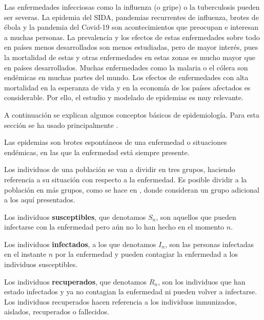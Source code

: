 Las enfermedades infecciosas como la influenza (o gripe) o la tuberculosis pueden ser severas. La epidemia del SIDA, pandemias recurrentes de influenza, brotes de ébola y la pandemia del Covid-19 son acontecimientos que preocupan e interesan a muchas personas. La prevalencia y los efectos de estas enfermedades sobre todo en países menos desarrollados son menos estudiadas, pero de mayor interés, pues la mortalidad de estas y otras enfermedades en estas zonas es mucho mayor que en países desarrollados. Muchas enfermedades como la malaria o el cólera son endémicas en muchas partes del mundo. Los efectos de enfermedades con alta mortalidad en la esperanza de vida y en la economía de los países afectados es considerable. Por ello, el estudio y modelado de epidemias es muy relevante.

A continuación se explican algunos conceptos básicos de epidemiología. Para esta sección se ha usado principalmente \cite{brauerMathematicalModelsPopulation2012}.

\begin{definition}
Las epidemias son brotes espontáneos de una enfermedad o situaciones endémicas, en las que la enfermedad está siempre presente.
\end{definition}

Los individuos de una población se van a dividir en tres grupos, haciendo referencia a su situación con respecto a la enfermedad. Es posible dividir a la población en más grupos, como se hace en \cite{gutierrez2020analisis}, donde consideran un grupo adicional a los aquí presentados.

\begin{definition}
Los individuos \textbf{susceptibles}, que denotamos $S_n$, son aquellos que pueden infectarse con la enfermedad pero aún no lo han hecho en el momento $n$.
\end{definition}

\begin{definition}
Los individuos \textbf{infectados}, a los que denotamos $I_n$, son las personas infectadas en el instante $n$ por la enfermedad y pueden contagiar la enfermedad a los individuos susceptibles.
\end{definition}

\begin{definition}
Los individuos \textbf{recuperados}, que denotamos $R_n$, son los individuos que han estado infectados y ya no contagian la enfermedad ni pueden volver a infectarse.
Los individuos recuperados hacen referencia a los individuos inmunizados, aislados, recuperados o fallecidos.
\end{definition}

